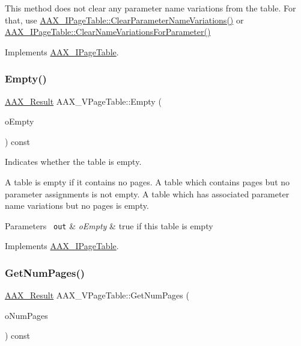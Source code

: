 This method does not clear any parameter name variations from the table. For that, use \mbox{\hyperlink{a01849_a6af3965eaf2baeadef9a44aa9c77ecbb}{A\+A\+X\+\_\+\+I\+Page\+Table\+::\+Clear\+Parameter\+Name\+Variations()}} or \mbox{\hyperlink{a01849_ae6cf05c366d982e8ea92fea1d98f1d22}{A\+A\+X\+\_\+\+I\+Page\+Table\+::\+Clear\+Name\+Variations\+For\+Parameter()}} 

Implements \mbox{\hyperlink{a01849_a00a902ce17c43ae32947dba6088936d2}{A\+A\+X\+\_\+\+I\+Page\+Table}}.

\mbox{\label{a01929_af6f96732f058f79df4c05cadb8e4ceef}} 
\subsubsection{\texorpdfstring{Empty()}{Empty()}}
{\footnotesize\ttfamily \mbox{\hyperlink{a00392_a4d8f69a697df7f70c3a8e9b8ee130d2f}{A\+A\+X\+\_\+\+Result}} A\+A\+X\+\_\+\+V\+Page\+Table\+::\+Empty (\begin{DoxyParamCaption}\item[{\mbox{\hyperlink{a00392_aa216506530f1d19a2965931ced2b274b}{A\+A\+X\+\_\+\+C\+Boolean}} \&}]{o\+Empty }\end{DoxyParamCaption}) const\hspace{0.3cm}{\ttfamily [virtual]}}



Indicates whether the table is empty. 

A table is empty if it contains no pages. A table which contains pages but no parameter assignments is not empty. A table which has associated parameter name variations but no pages is empty.


\begin{DoxyParams}[1]{Parameters}
\mbox{\texttt{ out}}  & {\em o\+Empty} & {\ttfamily true} if this table is empty \\
\hline
\end{DoxyParams}


Implements \mbox{\hyperlink{a01849_a6953bc99853c741500f5619b8e675c30}{A\+A\+X\+\_\+\+I\+Page\+Table}}.

\mbox{\label{a01929_ae4f7ce9fd77ff4c7e1e079860c901200}} 
\subsubsection{\texorpdfstring{GetNumPages()}{GetNumPages()}}
{\footnotesize\ttfamily \mbox{\hyperlink{a00392_a4d8f69a697df7f70c3a8e9b8ee130d2f}{A\+A\+X\+\_\+\+Result}} A\+A\+X\+\_\+\+V\+Page\+Table\+::\+Get\+Num\+Pages (\begin{DoxyParamCaption}\item[{int32\+\_\+t \&}]{o\+Num\+Pages }\end{DoxyParamCaption}) const\hspace{0.3cm}{\ttfamily [virtual]}}



